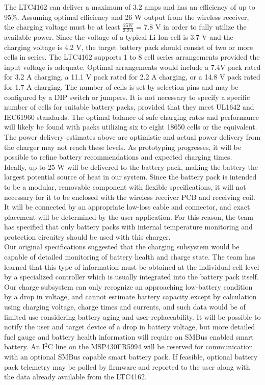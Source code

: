\documentclass[12pt]{article}
\begin{document}
\indent
The LTC4162 can deliver a maximum of 3.2 amps and has an efficiency of up to 95\%. Assuming optimal efficiency and 26 W output from the wireless receiver, the charging voltage must be at least $\frac{25 W}{3.2 A}$ = 7.8 V in order to fully utilize the available power. Since the voltage of a typical Li-Ion cell is 3.7 V and the charging voltage is 4.2 V, the target battery pack should consist of two or more cells in series. The LTC4162 supports 1 to 8 cell series arrangements provided the input voltage is adequate. Optimal arrangements would include a 7.4V pack rated for 3.2 A charging, a 11.1 V pack rated for 2.2 A charging, or a 14.8 V pack rated for 1.7 A charging. The number of cells is set by selection pins and may be configured by a DIP switch or jumpers. It is not necessary to specify a specific number of cells for suitable battery packs, provided that they meet UL1642 and IEC61960 standards. The optimal balance of safe charging rates and performance will likely be found with packs utilizing six to eight 18650 cells or the equivalent. The power delivery estimates above are optimistic and actual power delivery from the charger may not reach these levels. As prototyping progresses, it will be possible to refine battery recommendations and expected charging times.\\

\indent
Ideally, up to 25 W will be delivered to the battery pack, making the battery the largest potential source of heat in our system. Since the battery pack is intended to be a modular, removable component with flexible specifications, it will not necessary for it to be enclosed with the wireless receiver PCB and receiving coil. It will be connected by an appropriate low-loss cable and connector, and exact placement will be determined by the user application. For this reason, the team has specified that only battery packs with internal temperature monitoring and protection circuitry should be used with this charger.\\

\indent
Our original specifications suggested that the charging subsystem would be capable of detailed monitoring of battery health and charge state. The team has learned that this type of information must be obtained at the individual cell level by a specialized controller which is usually integrated into the battery pack itself. Our charge subsystem can only recognize an approaching low-battery condition by a drop in voltage, and cannot estimate battery capacity except by calculation using charging voltage, charge times and currents, and such data would be of limited use considering battery aging and user-replaceability. It will be possible to notify the user and target device of a drop in battery voltage, but more detailed fuel gauge and battery health information will require an SMBus enabled smart battery. An I$^2$C line on the MSP430FR5994 will be reserved for communication with an optional SMBus capable smart battery pack. If feasible, optional battery pack telemetry may be polled by firmware and reported to the user along with the data already available from the LTC4162.\\
\end{document}
